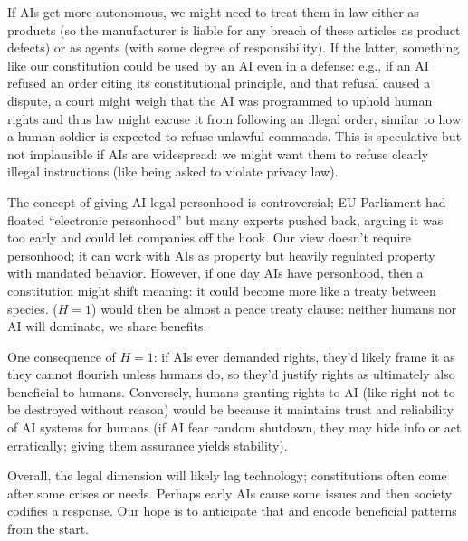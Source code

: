 \documentclass[12pt]{article}
\begin{document}
If AIs get more autonomous, we might need to treat them in law either as products (so the manufacturer is liable for any breach of these articles as product defects) or as agents (with some degree of responsibility). If the latter, something like our constitution could be used by an AI even in a defense: e.g., if an AI refused an order citing its constitutional principle, and that refusal caused a dispute, a court might weigh that the AI was programmed to uphold human rights and thus law might excuse it from following an illegal order, similar to how a human soldier is expected to refuse unlawful commands. This is speculative but not implausible if AIs are widespread: we might want them to refuse clearly illegal instructions (like being asked to violate privacy law).

The concept of giving AI legal personhood is controversial; EU Parliament had floated “electronic personhood” but many experts pushed back, arguing it was too early and could let companies off the hook. Our view doesn’t require personhood; it can work with AIs as property but heavily regulated property with mandated behavior. However, if one day AIs have personhood, then a constitution might shift meaning: it could become more like a treaty between species. ($H=1$) would then be almost a peace treaty clause: neither humans nor AI will dominate, we share benefits.

One consequence of $H=1$: if AIs ever demanded rights, they’d likely frame it as they cannot flourish unless humans do, so they’d justify rights as ultimately also beneficial to humans. Conversely, humans granting rights to AI (like right not to be destroyed without reason) would be because it maintains trust and reliability of AI systems for humans (if AI fear random shutdown, they may hide info or act erratically; giving them assurance yields stability).

Overall, the legal dimension will likely lag technology; constitutions often come after some crises or needs. Perhaps early AIs cause some issues and then society codifies a response. Our hope is to anticipate that and encode beneficial patterns from the start.
\end{document}
